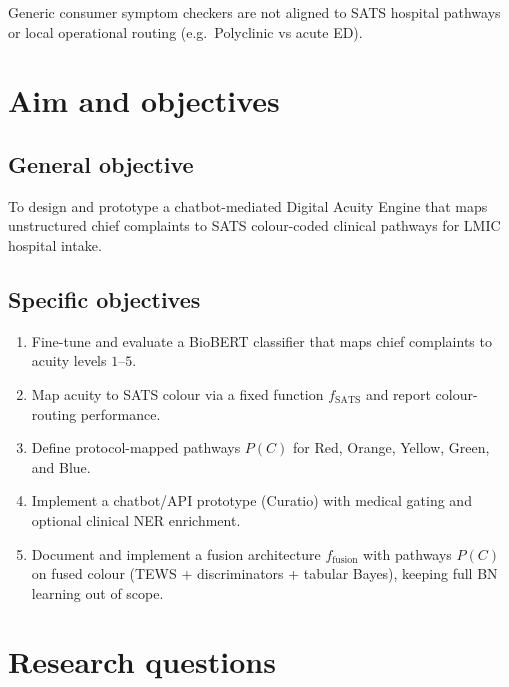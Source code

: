 Generic consumer symptom checkers are not aligned to SATS hospital pathways or local operational routing (e.g.\ Polyclinic vs acute ED).

\section{Aim and objectives}

\subsection{General objective}

To design and prototype a chatbot-mediated Digital Acuity Engine that maps unstructured chief complaints to SATS colour-coded clinical pathways for LMIC hospital intake.

\subsection{Specific objectives}

\begin{enumerate}
  \item Fine-tune and evaluate a BioBERT classifier that maps chief complaints to acuity levels \(1\)--\(5\).
  \item Map acuity to SATS colour via a fixed function \(f_{\mathrm{SATS}}\) and report colour-routing performance.
  \item Define protocol-mapped pathways \(P(C)\) for Red, Orange, Yellow, Green, and Blue.
  \item Implement a chatbot/API prototype (Curatio) with medical gating and optional clinical NER enrichment.
  \item Document and implement a fusion architecture \(f_{\mathrm{fusion}}\) with pathways \(P(C)\) on fused colour (TEWS + discriminators + tabular Bayes), keeping full BN learning out of scope.
\end{enumerate}

\section{Research questions}
\label{sec:rqs}

